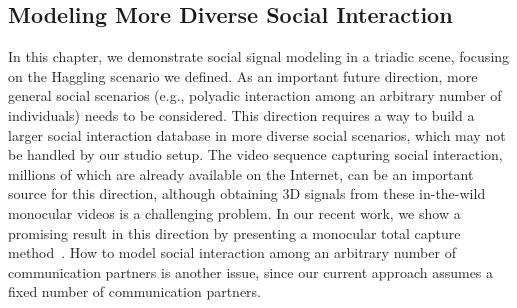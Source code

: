 \subsection{Modeling More Diverse Social Interaction}
In this chapter, we demonstrate social signal modeling in a triadic scene, focusing on the Haggling scenario we defined. As an important future direction, more general social scenarios (e.g., polyadic interaction among an arbitrary number of individuals) needs to be considered. This direction requires a way to build a larger social interaction database in more diverse social scenarios, which may not be handled by our studio setup. The video sequence capturing social interaction, millions of which are already available on the Internet, can be an important source for this direction, although obtaining 3D signals from these in-the-wild monocular videos is a challenging problem. In our recent work, we show a promising result in this direction by presenting a monocular total capture method~\cite{Xiang2019}. How to model social interaction among an arbitrary number of communication partners is another issue, since our current approach assumes a fixed number of communication partners. 

%
%


